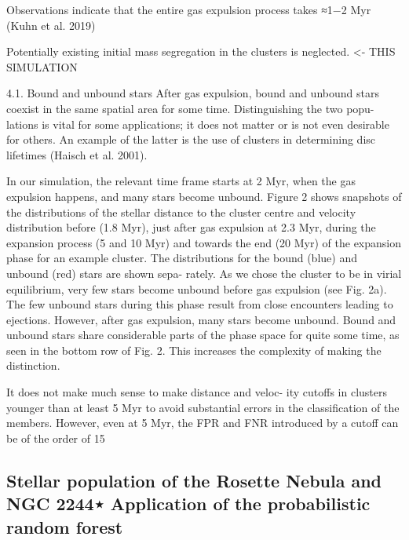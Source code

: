 \documentclass[../Main.tex]{subfiles}
\begin{document}
{Observations indicate that the entire gas expulsion process
takes ≈1−2 Myr (Kuhn et al. 2019)

Potentially existing initial mass segregation in
the clusters is neglected. <- THIS SIMULATION

4.1. Bound and unbound stars
After gas expulsion, bound and unbound stars coexist in the
same spatial area for some time. Distinguishing the two popu-
lations is vital for some applications; it does not matter or is not
even desirable for others. An example of the latter is the use of
clusters in determining disc lifetimes (Haisch et al. 2001). 

In our simulation, the relevant time frame starts at 2 Myr,
when the gas expulsion happens, and many stars become
unbound. Figure 2 shows snapshots of the distributions of the
stellar distance to the cluster centre and velocity distribution
before (1.8 Myr), just after gas expulsion at 2.3 Myr, during the
expansion process (5 and 10 Myr) and towards the end (20 Myr)
of the expansion phase for an example cluster. The distributions
for the bound (blue) and unbound (red) stars are shown sepa-
rately. As we chose the cluster to be in virial equilibrium, very
few stars become unbound before gas expulsion (see Fig. 2a).
The few unbound stars during this phase result from close
encounters leading to ejections. However, after gas expulsion,
many stars become unbound. Bound and unbound stars share
considerable parts of the phase space for quite some time, as
seen in the bottom row of Fig. 2. This increases the complexity
of making the distinction.

It does not make much sense to make distance and veloc-
ity cutoﬀs in clusters younger than at least 5 Myr to avoid
substantial errors in the classification of the members. However,
even at 5 Myr, the FPR and FNR introduced by a cutoﬀ can be of
the order of 15%


\subsection{Stellar population of the Rosette Nebula and NGC 2244⋆
Application of the probabilistic random forest}



}
\end{document}
